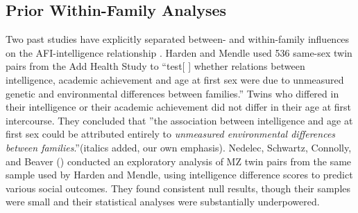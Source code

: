 \subsection{Prior Within-Family Analyses} Two past studies have explicitly separated between- and within-family influences on the AFI-intelligence relationship \citep{harden2011don,nedelec2012exploring}. Harden and Mendle used 536 same-sex twin pairs from the Add Health Study to ``test[ ] whether relations between intelligence, academic achievement and age at first sex were due to unmeasured genetic and environmental differences between families.'' Twins who differed in their intelligence or their academic achievement did not differ in their age at first intercourse. They concluded that ''the association between intelligence and age at first sex could be attributed entirely to \textit{unmeasured environmental differences between families}.''(italics added, our own emphasis). Nedelec, Schwartz, Connolly, and Beaver (\citeyear{nedelec2012exploring}) conducted an exploratory analysis of MZ twin pairs from the same sample used by Harden and Mendle, using intelligence difference scores to predict various social outcomes. They found consistent null results, though their samples were small and their statistical analyses were substantially underpowered.

